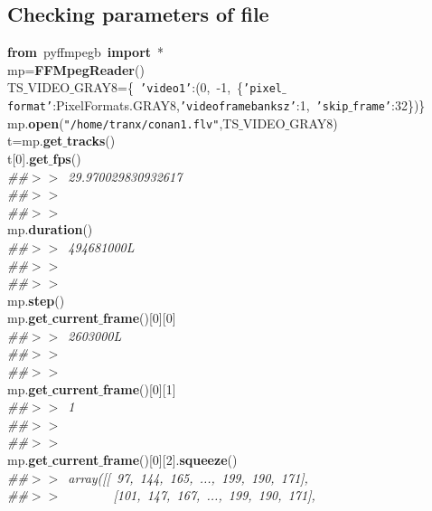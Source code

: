 \documentclass{report}
\begin{document}
\subsection{Checking parameters of file}
\begin{minipage}{\textwidth}
{\small
\noindent
\mbox{}\textbf{from}\ pyffmpegb\ \textbf{import}\ * \\
\mbox{}mp=\textbf{FFMpegReader}() \\
\mbox{}TS$\_$VIDEO$\_$GRAY8=\{\ \texttt{'video1'}:(0,\ -1,\ \{\texttt{'pixel$\_$format'}:PixelFormats.GRAY8,\texttt{'videoframebanksz'}:1,\ \texttt{'skip$\_$frame'}:32\})\} \\
\mbox{}mp.\textbf{open}(\texttt{"{}/home/tranx/conan1.flv"{}},TS$\_$VIDEO$\_$GRAY8) \\
\mbox{}t=mp.\textbf{get$\_$tracks}() \\
\mbox{}t[0].\textbf{get$\_$fps}() \\
\mbox{}\textit{\#\#$>$$>$\ 29.970029830932617} \\
\mbox{}\textit{\#\#$>$$>$\ } \\
\mbox{}\textit{\#\#$>$$>$\ } \\
\mbox{}mp.\textbf{duration}() \\
\mbox{}\textit{\#\#$>$$>$\ 494681000L} \\
\mbox{}\textit{\#\#$>$$>$\ } \\
\mbox{}\textit{\#\#$>$$>$\ } \\
\mbox{}mp.\textbf{step}() \\
\mbox{}mp.\textbf{get$\_$current$\_$frame}()[0][0] \\
\mbox{}\textit{\#\#$>$$>$\ 2603000L} \\
\mbox{}\textit{\#\#$>$$>$\ } \\
\mbox{}\textit{\#\#$>$$>$\ } \\
\mbox{}mp.\textbf{get$\_$current$\_$frame}()[0][1] \\
\mbox{}\textit{\#\#$>$$>$\ 1} \\
\mbox{}\textit{\#\#$>$$>$\ } \\
\mbox{}\textit{\#\#$>$$>$\ } \\
\mbox{}mp.\textbf{get$\_$current$\_$frame}()[0][2].\textbf{squeeze}() \\
\mbox{}\textit{\#\#$>$$>$\ array([[\ 97,\ 144,\ 165,\ ...,\ 199,\ 190,\ 171],} \\
\mbox{}\textit{\#\#$>$$>$\ \ \ \ \ \ \ \ [101,\ 147,\ 167,\ ...,\ 199,\ 190,\ 171],} \\
}
\end{minipage}
\end{document}
